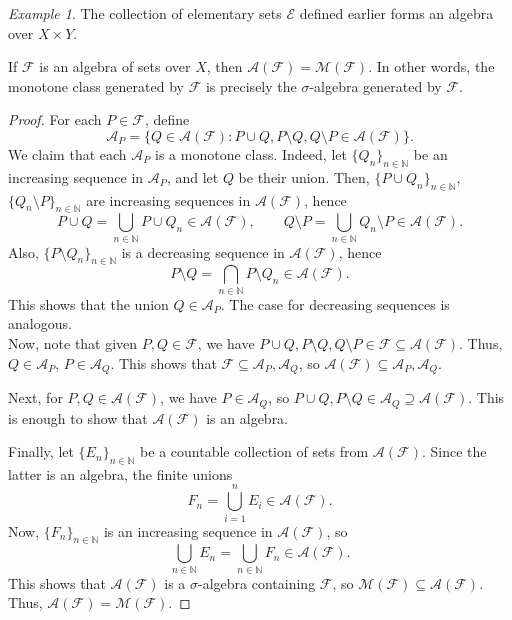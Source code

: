 \documentclass[11pt]{article}
\newcommand{\N}{\mathbb{N}}
\newcommand{\M}{\mathcal{M}}
\theoremstyle{definition}
\theoremstyle{remark}
\newtheorem*{example}{Example}
\numberwithin{equation}{section}
\begin{document}
    \begin{example}
        The collection of elementary sets $\mathcal{E}$ defined earlier forms an
        algebra over $X \times Y$.
    \end{example}
    

    \begin{theorem}
        If $\mathcal{F}$ is an algebra of sets over $X$, then
        $\mathcal{A}(\mathcal{F}) = \mathcal{M}(\mathcal{F})$. In other words, the
        monotone class generated by $\mathcal{F}$ is precisely the $\sigma$-algebra
        generated by $\mathcal{F}$.
    \end{theorem}
    \begin{proof}
        For each $P \in \mathcal{F}$, define \[
            \mathcal{A}_P = \{Q \in \mathcal{A}(\mathcal{F}): P\cup Q, P\setminus Q,
            Q\setminus P \in \mathcal{A}(\mathcal{F})\}.
        \] We claim that each $\mathcal{A}_P$ is a monotone class. Indeed, let
        $\{Q_n\}_{n \in \N}$ be an increasing sequence in $\mathcal{A}_P$, and let
        $Q$ be their union. Then, $\{P\cup Q_n\}_{n \in \N}$, $\{Q_n \setminus P\}_{n
        \in \N}$ are increasing sequences in $\mathcal{A}(\mathcal{F})$, hence \[
            P \cup Q = \bigcup_{n \in \N} P\cup Q_n \in \mathcal{A}(\mathcal{F}), \qquad
            Q\setminus P = \bigcup_{n \in \N} Q_n\setminus P \in
            \mathcal{A}(\mathcal{F}).
        \] Also, $\{P\setminus Q_n\}_{n \in \N}$ is a decreasing sequence in
        $\mathcal{A}(\mathcal{F})$, hence \[
            P\setminus Q = \bigcap_{n \in \N} P\setminus Q_n \in
            \mathcal{A}(\mathcal{F}).
        \] This shows that the union $Q \in \mathcal{A}_P$. The case for decreasing
        sequences is analogous. \\

        Now, note that given $P, Q \in \mathcal{F}$, we have $P \cup Q, P\setminus Q,
        Q\setminus P \in \mathcal{F} \subseteq \mathcal{A}(\mathcal{F})$. Thus, $Q
        \in \mathcal{A}_P$, $P \in \mathcal{A}_Q$. This shows that $\mathcal{F}
        \subseteq \mathcal{A}_P, \mathcal{A}_Q$, so $\mathcal{A}(\mathcal{F})
        \subseteq \mathcal{A}_P, \mathcal{A}_Q$.

        Next, for $P, Q \in \mathcal{A}(\mathcal{F})$, we have $P \in \mathcal{A}_Q$,
        so $P \cup Q, P\setminus Q \in \mathcal{A}_Q \supseteq
        \mathcal{A}(\mathcal{F})$. This is enough to show that
        $\mathcal{A}(\mathcal{F})$ is an algebra.

        Finally, let $\{E_n\}_{n \in \N}$ be a countable collection of sets from
        $\mathcal{A}(\mathcal{F})$. Since the latter is an algebra, the finite unions
        \[
            F_n = \bigcup_{i = 1}^n E_i \in \mathcal{A}(\mathcal{F}).
        \] Now, $\{F_n\}_{n \in \N}$ is an increasing sequence in
        $\mathcal{A}(\mathcal{F})$, so \[
            \bigcup_{n \in \N} E_n = \bigcup_{n \in \N} F_n \in
            \mathcal{A}(\mathcal{F}).
        \] This shows that $\mathcal{A}(\mathcal{F})$ is a $\sigma$-algebra
        containing $\mathcal{F}$, so $\M(\mathcal{F}) \subseteq
        \mathcal{A}(\mathcal{F})$. Thus, $\mathcal{A}(\mathcal{F}) =
        \M(\mathcal{F})$.
    \end{proof} 
\end{document}

